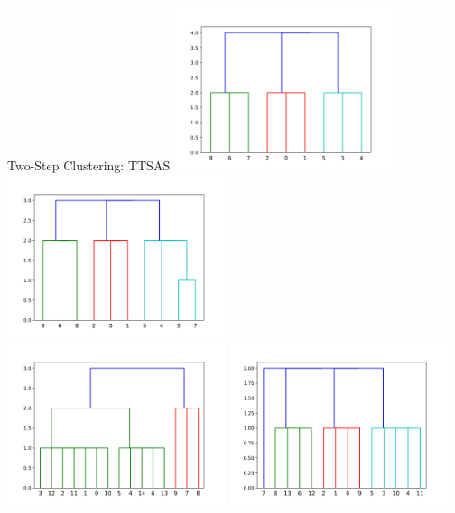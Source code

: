 \documentclass[rgb]{beamer}
\begin{document}
        \begin{frame}{Two-Step Clustering: TTSAS}
           \centering  \includegraphics[keepaspectratio,width=0.48\textwidth, height=0.48\textheight]{graphics/results_two_step/noise_0_ttsas_dendro.png} \hspace{2cm}
             \includegraphics[keepaspectratio,width=0.48\textwidth, height=0.48\textheight]{graphics/results_two_step/noise_10_ttsas_dendro.png} \\
             \includegraphics[keepaspectratio,width=0.48\textwidth, height=0.48\textheight]{graphics/results_two_step/noise_33_ttsas_dendro.png} \hspace{2cm}
             \includegraphics[keepaspectratio,width=0.48\textwidth, height=0.48\textheight]{graphics/results_two_step/noise_50_ttsas_dendro.png}
        \end{frame}{}
        
\end{document}
